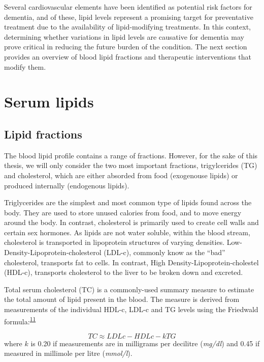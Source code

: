 \documentclass[a4paper, twoside]{templates/ociamthesis}
\begin{document}
Several cardiovascular elements have been identified as potential risk factors for dementia, and of these, lipid levels represent a promising target for preventative treatment due to the availability of lipid-modifying treatments. In this context, determining whether variations in lipid levels are causative for dementia may prove critical in reducing the future burden of the condition. The next section provides an overview of blood lipid fractions and therapeutic interventions that modify them.

\hypertarget{serum-lipids}{%
\section{Serum lipids}\label{serum-lipids}}

\hypertarget{lipid-fractions}{%
\subsection{Lipid fractions}\label{lipid-fractions}}

The blood lipid profile contains a range of fractions. However, for the sake of this thesis, we will only consider the two most important fractions, trigylcerides (TG) and cholesterol, which are either absorded from food (exogenouse lipids) or produced internally (endogenous lipids).

Triglycerides are the simplest and most common type of lipids found across the body. They are used to store unused calories from food, and to move energy around the body. In contrast, cholesterol is primarily used to create cell walls and certain sex hormones. As lipids are not water soluble, within the blood stream, cholesterol is transported in lipoprotein structures of varying densities. Low-Density-Lipoprotein-cholesterol (LDL-c), commonly know as the ``bad'' cholesterol, transports fat to cells. In contrast, High Density-Lipoprotein-cholestel (HDL-c), transports cholesterol to the liver to be broken down and excreted.

Total serum cholesterol (TC) is a commonly-used summary measure to estimate the total amount of lipid present in the blood. The measure is derived from measurements of the individual HDL-c, LDL-c and TG levels using the Friedwald formula:\textsuperscript{\protect\hyperlink{ref-friedewald1972}{11}}

\[TC \approx LDLc - HDLc - kTG\]
where \(k\) is 0.20 if measurements are in milligrams per decilitre (\emph{mg/dl}) and 0.45 if measured in millimole per litre (\emph{mmol/l}).
\end{document}
